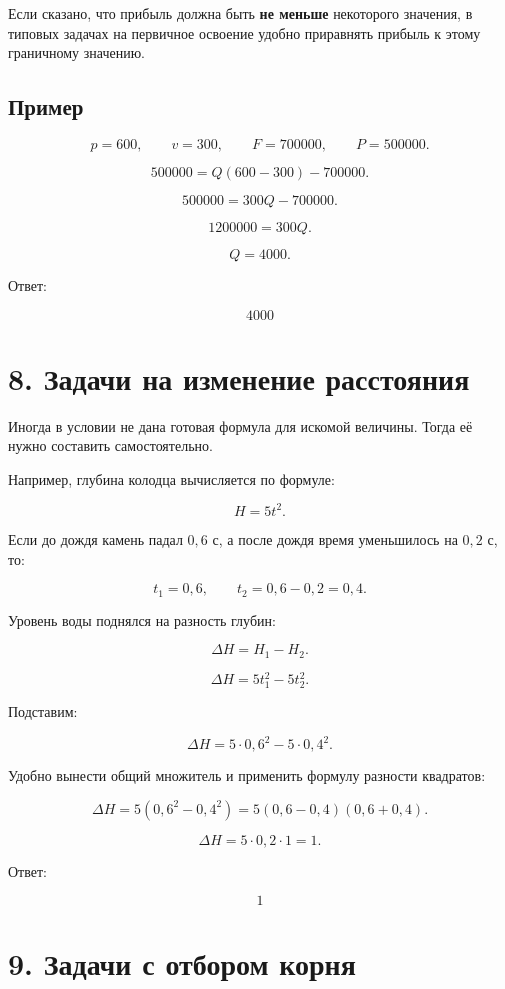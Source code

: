 \documentclass[a4paper,12pt]{article}
\begin{document}
Если сказано, что прибыль должна быть \textbf{не меньше} некоторого значения, в типовых задачах на первичное освоение удобно приравнять прибыль к этому граничному значению.

\subsection*{Пример}

\[
p=600,
\qquad
v=300,
\qquad
F=700000,
\qquad
P=500000.
\]

\[
500000=Q(600-300)-700000.
\]

\[
500000=300Q-700000.
\]

\[
1200000=300Q.
\]

\[
Q=4000.
\]

Ответ:

\[
\boxed{4000}
\]

\section*{8. Задачи на изменение расстояния}

Иногда в условии не дана готовая формула для искомой величины. Тогда её нужно составить самостоятельно.

Например, глубина колодца вычисляется по формуле:

\[
H=5t^2.
\]

Если до дождя камень падал \(0{,}6\) с, а после дождя время уменьшилось на \(0{,}2\) с, то:

\[
t_1=0{,}6,
\qquad
t_2=0{,}6-0{,}2=0{,}4.
\]

Уровень воды поднялся на разность глубин:

\[
\Delta H=H_1-H_2.
\]

\[
\Delta H=5t_1^2-5t_2^2.
\]

Подставим:

\[
\Delta H=5\cdot0{,}6^2-5\cdot0{,}4^2.
\]

Удобно вынести общий множитель и применить формулу разности квадратов:

\[
\Delta H=5(0{,}6^2-0{,}4^2)
=5(0{,}6-0{,}4)(0{,}6+0{,}4).
\]

\[
\Delta H=5\cdot0{,}2\cdot1=1.
\]

Ответ:

\[
\boxed{1}
\]

\section*{9. Задачи с отбором корня}
\end{document}
